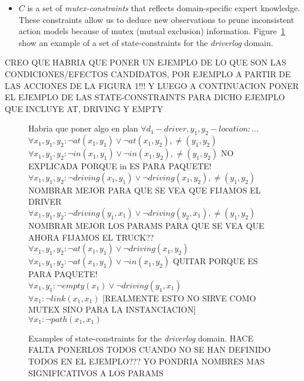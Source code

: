 \documentclass{ecai}
\begin{document}
\begin{itemize}
\item $C$ is a set of {\em mutex-constraints} that reflects domain-specific expert knowledge. These constraints allow us to deduce new observations to prune inconsistent action models because of mutex (mutual exclusion) information. Figure~\ref{fig:example-statecs} show an example of a set of state-constraints for the {\em driverlog} domain. 
\end{itemize}


CREO QUE HABRIA QUE PONER UN EJEMPLO DE LO QUE SON LAS CONDICIONES/EFECTOS CANDIDATOS, POR EJEMPLO A PARTIR DE LAS ACCIONES DE LA FIGURA 1!!! Y LUEGO A CONTINUACION PONER EL EJEMPLO DE LAS STATE-CONSTRAINTS PARA DICHO EJEMPLO QUE INCLUYE AT, DRIVING Y EMPTY


\begin{figure}
  \begin{scriptsize}
Habria que poner algo en plan $\forall d_1 - driver, y_1,y_2 - location: ...$ \\
$\forall x_1,y_1,y_2: \neg at(x_1,y_1)\vee\neg at(x_1,y_2), \neq (y_1,y_2)$\\
$\forall x_1,y_1,y_2: \neg in(x_1,y_1)\vee\neg in(x_1,y_2), \neq (y_1,y_2)$  NO EXPLICADA PORQUE in ES PARA PAQUETE! \\
$\forall x_1,y_1,y_2: \neg driving(x_1,y_1)\vee\neg driving(x_1,y_2), \neq (y_1,y_2)$ NOMBRAR MEJOR PARA QUE SE VEA QUE FIJAMOS EL DRIVER\\
$\forall x_1,y_1,y_2: \neg driving(y_1,x_1)\vee\neg driving(y_2,x_1), \neq (y_1,y_2)$  NOMBRAR MEJOR LOS PARAMS PARA QUE SE VEA QUE AHORA FIJAMOS EL TRUCK?? \\
$\forall x_1,y_1,y_2: \neg at(x_1,y_1)\vee\neg driving(x_1,y_2)$\\
$\forall x_1,y_1,y_2: \neg at(x_1,y_1)\vee\neg in(x_1,y_2)$ QUITAR PORQUE ES PARA PAQUETE! \\
$\forall x_1,y_1: \neg empty(x_1)\vee\neg driving(y_1,x_1)$\\
$\forall x_1: \neg link(x_1,x_1)$ [REALMENTE ESTO NO SIRVE COMO MUTEX SINO PARA LA INSTANCIACION] \\
$\forall x_1: \neg path(x_1,x_1)$\\
\end{scriptsize}      
\caption{Examples of state-constraints for the {\em driverlog} domain. HACE FALTA PONERLOS TODOS CUANDO NO SE HAN DEFINIDO TODOS EN EL EJEMPLO??? YO PONDRIA NOMBRES MAS SIGNIFICATIVOS A LOS PARAMS}
\label{fig:example-statecs}
\end{figure}
\end{document}
